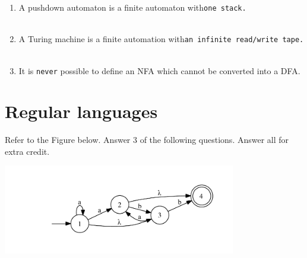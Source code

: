 \documentclass[10pt]{amsart}
\begin{document}
\begin{enumerate}
\item A pushdown automaton is a finite automaton with\hfill\verb+one stack.+\\\\
\item A Turing machine is a finite automation with\hfill\verb+an infinite read/write tape.+\\\\
\item It is  \hspace{1in}\verb+never+ possible to define an NFA which cannot be converted into a DFA. 
\end{enumerate}

\section{Regular languages}
Refer to the Figure below. Answer 3 of the following questions. Answer all for extra credit.
\begin{center}
\includegraphics[width=4in]{nfa}
\end{center}
\end{document}
